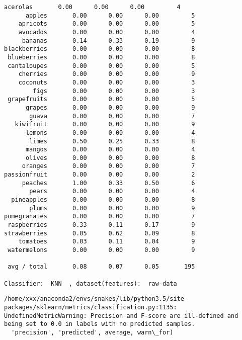 \documentclass[11pt]{article}
\begin{document}
\begin{Verbatim}[commandchars=\\\{\}]
    acerolas       0.00      0.00      0.00         4
      apples       0.00      0.00      0.00         5
    apricots       0.00      0.00      0.00         5
    avocados       0.00      0.00      0.00         4
     bananas       0.14      0.33      0.19         9
blackberries       0.00      0.00      0.00         8
 blueberries       0.00      0.00      0.00         8
 cantaloupes       0.00      0.00      0.00         5
    cherries       0.00      0.00      0.00         9
    coconuts       0.00      0.00      0.00         3
        figs       0.00      0.00      0.00         3
 grapefruits       0.00      0.00      0.00         5
      grapes       0.00      0.00      0.00         9
       guava       0.00      0.00      0.00         7
   kiwifruit       0.00      0.00      0.00         9
      lemons       0.00      0.00      0.00         4
       limes       0.50      0.25      0.33         8
      mangos       0.00      0.00      0.00         4
      olives       0.00      0.00      0.00         8
     oranges       0.00      0.00      0.00         7
passionfruit       0.00      0.00      0.00         2
     peaches       1.00      0.33      0.50         6
       pears       0.00      0.00      0.00         4
  pineapples       0.00      0.00      0.00         8
       plums       0.00      0.00      0.00         9
pomegranates       0.00      0.00      0.00         7
 raspberries       0.33      0.11      0.17         9
strawberries       0.05      0.62      0.09         8
    tomatoes       0.03      0.11      0.04         9
 watermelons       0.00      0.00      0.00         9

 avg / total       0.08      0.07      0.05       195

Classifier:  KNN  , dataset(features):  raw-data

    \end{Verbatim}

    \begin{Verbatim}[commandchars=\\\{\}]
/home/xxx/anaconda2/envs/snakes/lib/python3.5/site-packages/sklearn/metrics/classification.py:1135: UndefinedMetricWarning: Precision and F-score are ill-defined and being set to 0.0 in labels with no predicted samples.
  'precision', 'predicted', average, warn\_for)

    \end{Verbatim}
\end{document}
